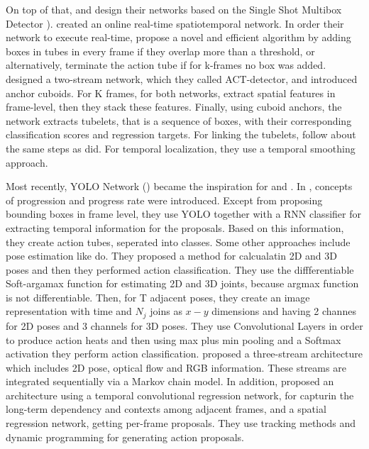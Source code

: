 On top of that, \cite{singh2016online} and \cite{kalogeiton17iccv:hal-01519812} design their networks based on the Single Shot Multibox Detector \cite{DBLP:journals/corr/LiuAESR15}).
\cite{singh2016online} created an online real-time spatiotemporal network. In order their network to execute real-time,  \cite{singh2016online} propose a novel and efficient algorithm
by adding boxes in tubes in every frame if they overlap more than a threshold, or alternatively, terminate the action tube if for k-frames no box was added.  \cite{kalogeiton17iccv:hal-01519812}
designed a two-stream network, which they called ACT-detector, and introduced anchor cuboids. For K frames, for both networks, \cite{kalogeiton17iccv:hal-01519812} extract spatial
features in frame-level, then they stack these features. Finally, using cuboid anchors, the network extracts tubelets, that is a sequence of boxes, with their corresponding classification
scores and regression targets. For linking the tubelets, \cite{kalogeiton17iccv:hal-01519812} follow about the same steps as \cite{singh2016online} did. For temporal localization, they use
a temporal smoothing approach. \par

Most recently, YOLO Network (\cite{DBLP:journals/corr/RedmonDGF15}) became the inspiration for \cite{DBLP:journals/corr/abs-1903-00304} and
\cite{DBLP:journals/corr/abs-1802-08362}. In \cite{DBLP:journals/corr/abs-1903-00304}, concepts of progression and progress
rate were introduced. Except from proposing bounding boxes in frame level, they use YOLO together with a RNN classifier for extracting temporal information for the proposals.
Based on this information, they create action tubes, seperated into classes. Some other approaches include pose estimation like \cite{DBLP:journals/corr/abs-1802-09232} do. 
They proposed a method for calcualatin 2D and 3D poses and then they performed action classification. They use the diffferentiable Soft-argamax function for estimating 2D and 3D joints, because
argmax function is not differentiable. Then, for T adjacent poses, they create an image representation with time and $N_j$ joins as $x-y$ dimensions and having 2 channes for 2D poses and 3
channels for 3D poses. They use Convolutional Layers in order to produce action heats and then using max plus min pooling and a Softmax activation they perform action classification.
\cite{DBLP:journals/corr/ZolfaghariOSB17} proposed a three-stream architecture which includes 2D pose, optical flow and RGB information. These streams are integrated sequentially via a Markov
chain model. In addition, \cite{8237881} proposed an architecture using a temporal convolutional regression network, for capturin the long-term dependency and contexts among adjacent
frames, and a spatial regression network,
getting per-frame proposals. They use tracking methods and dynamic programming for generating action proposals.\par

